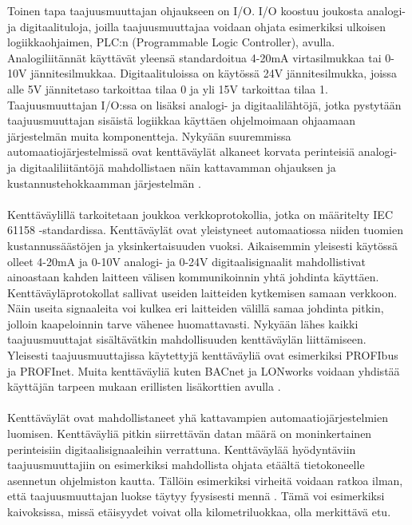 \documentclass[finnish,12pt,a4paper,pdftex,elec,utf8]{aaltothesis}
\begin{document}
\noindent
Toinen tapa taajuusmuuttajan ohjaukseen on I/O. I/O koostuu joukosta analogi- ja digitaalituloja, joilla taajuusmuuttajaa voidaan ohjata esimerkiksi ulkoisen logiikkaohjaimen, PLC:n (Programmable Logic Controller), avulla. Analogiliitännät käyttävät yleensä standardoitua 4-20mA virtasilmukkaa tai 0-10V jännitesilmukkaa. Digitaalituloissa on käytössä 24V jännitesilmukka, joissa alle 5V jännitetaso tarkoittaa tilaa 0 ja yli 15V tarkoittaa tilaa 1. Taajuusmuuttajan I/O:ssa on lisäksi analogi- ja digitaalilähtöjä, jotka pystytään taajuusmuuttajan sisäistä logiikkaa käyttäen ohjelmoimaan ohjaamaan järjestelmän muita komponentteja. Nykyään suuremmissa automaatiojärjestelmissä ovat kenttäväylät alkaneet korvata perinteisiä analogi- ja digitaaliliitäntöjä mahdollistaen näin kattavamman ohjauksen ja kustannustehokkaamman järjestelmän \cite{MyyntiHaastattelu}.
\\\\
Kenttäväylillä tarkoitetaan joukkoa verkkoprotokollia, jotka on määritelty IEC 61158 -standardissa. Kenttäväylät ovat yleistyneet automaatiossa niiden tuomien kustannussäästöjen ja yksinkertaisuuden vuoksi. Aikaisemmin yleisesti käytössä olleet 4-20mA ja 0-10V analogi- ja 0-24V digitaalisignaalit mahdollistivat ainoastaan kahden laitteen välisen kommunikoinnin yhtä johdinta käyttäen. Kenttäväyläprotokollat sallivat useiden laitteiden kytkemisen samaan verkkoon. Näin useita signaaleita voi kulkea eri laitteiden välillä samaa johdinta pitkin, jolloin kaapeloinnin tarve vähenee huomattavasti. Nykyään lähes kaikki taajuusmuuttajat sisältävätkin mahdollisuuden kenttäväylän liittämiseen. Yleisesti taajuusmuuttajissa käytettyjä kenttäväyliä ovat esimerkiksi PROFIbus ja PROFInet. Muita kenttäväyliä kuten BACnet ja LONworks voidaan yhdistää käyttäjän tarpeen mukaan erillisten lisäkorttien avulla \cite{880hwman}.
\\\\
Kenttäväylät ovat mahdollistaneet yhä kattavampien automaatiojärjestelmien luomisen. Kenttäväyliä pitkin siirrettävän datan määrä on moninkertainen perinteisiin digitaalisignaaleihin verrattuna. Kenttäväylää hyödyntäviin taajuusmuuttajiin on esimerkiksi mahdollista ohjata etäältä tietokoneelle asennetun ohjelmiston kautta. Tällöin esimerkiksi virheitä voidaan ratkoa ilman, että taajuusmuuttajan luokse täytyy fyysisesti mennä \cite{MyyntiHaastattelu}. Tämä voi esimerkiksi kaivoksissa, missä etäisyydet voivat olla kilometriluokkaa, olla merkittävä etu.
\\\\
\end{document}
